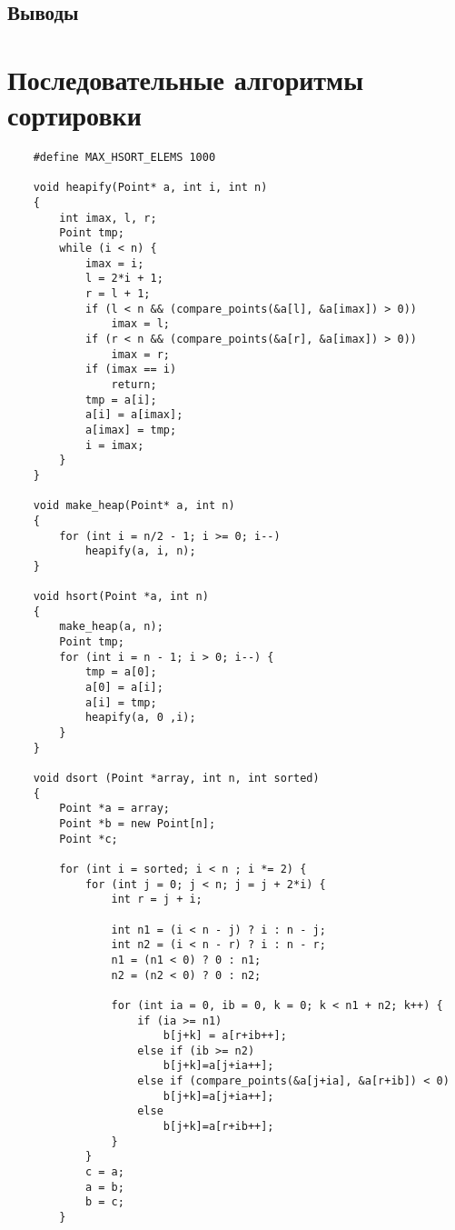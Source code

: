 \documentclass[oneside,final,14pt]{extreport}
\begin{document}
\section*{Выводы}

\newpage
\appendix
\chapter{Последовательные алгоритмы сортировки} \label{app:seq}
\begin{verbatim}
    #define MAX_HSORT_ELEMS 1000

    void heapify(Point* a, int i, int n)
    {
        int imax, l, r;
        Point tmp;
        while (i < n) {
            imax = i;
            l = 2*i + 1;
            r = l + 1;
            if (l < n && (compare_points(&a[l], &a[imax]) > 0))
                imax = l;
            if (r < n && (compare_points(&a[r], &a[imax]) > 0))
                imax = r;
            if (imax == i)
                return;
            tmp = a[i];
            a[i] = a[imax];
            a[imax] = tmp;
            i = imax;
        }
    }

    void make_heap(Point* a, int n)
    {
        for (int i = n/2 - 1; i >= 0; i--)
            heapify(a, i, n);
    }

    void hsort(Point *a, int n)
    {
        make_heap(a, n);
        Point tmp;
        for (int i = n - 1; i > 0; i--) {
            tmp = a[0];
            a[0] = a[i];
            a[i] = tmp;
            heapify(a, 0 ,i);
        }
    }

    void dsort (Point *array, int n, int sorted)
    {
        Point *a = array;
        Point *b = new Point[n];
        Point *c;

        for (int i = sorted; i < n ; i *= 2) {
            for (int j = 0; j < n; j = j + 2*i) {
                int r = j + i;

                int n1 = (i < n - j) ? i : n - j;
                int n2 = (i < n - r) ? i : n - r;
                n1 = (n1 < 0) ? 0 : n1;
                n2 = (n2 < 0) ? 0 : n2;

                for (int ia = 0, ib = 0, k = 0; k < n1 + n2; k++) {
                    if (ia >= n1)
                        b[j+k] = a[r+ib++];
                    else if (ib >= n2)
                        b[j+k]=a[j+ia++];
                    else if (compare_points(&a[j+ia], &a[r+ib]) < 0)
                        b[j+k]=a[j+ia++];
                    else
                        b[j+k]=a[r+ib++];
                }
            }
            c = a;
            a = b;
            b = c;
        }


\end{verbatim}
\end{document}
